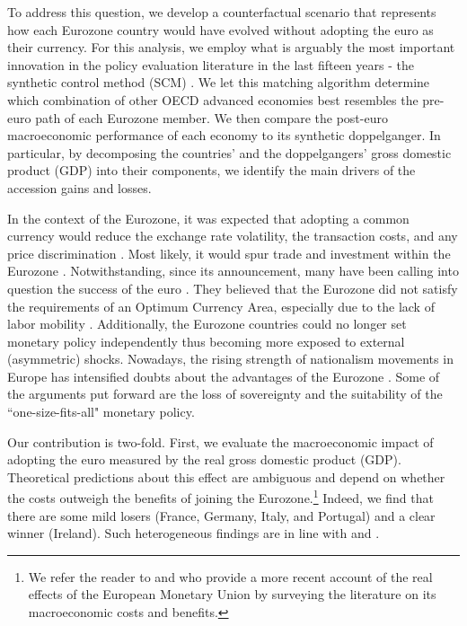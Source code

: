 \documentclass[12pt]{article}
\begin{document}
To address this question, we develop a counterfactual scenario that represents how each Eurozone country would have evolved without adopting the euro as their currency. For this analysis, we employ what is arguably the most important innovation in the policy evaluation literature in the last fifteen years - the synthetic control method (SCM) \citep{Athey2017}. We let this matching algorithm determine which combination of other OECD advanced economies best resembles the pre-euro path of each Eurozone member. We then compare the post-euro macroeconomic performance of each economy to its synthetic doppelganger. In particular, by decomposing the countries' and the doppelgangers' gross domestic product (GDP) into their components, we identify the main drivers of the accession gains and losses.

In the context of the Eurozone, it was expected that adopting a common currency would reduce the exchange rate volatility, the transaction costs, and any price discrimination \citep{DeGrauwe2020}. Most likely, it would spur trade and investment within the Eurozone \citep{Frankel1998}. Notwithstanding, since its announcement, many have been calling into question the success of the euro \citep{Wyplosz2006}. They believed that the Eurozone did not satisfy the requirements of an Optimum Currency Area, especially due to the lack of labor mobility \citep{Jonung2009}. Additionally, the Eurozone countries could no longer set monetary policy independently thus becoming more exposed to external (asymmetric) shocks. Nowadays, the rising strength of nationalism movements in Europe has intensified doubts about the advantages of the Eurozone \citep{Fligstein2012, Guiso2019}. Some of the arguments put forward are the loss of sovereignty and the suitability of the ``one-size-fits-all" monetary policy. %

Our contribution is two-fold. First, we evaluate the macroeconomic impact of adopting the euro measured by the real gross domestic product (GDP). Theoretical predictions about this effect are ambiguous and depend on whether the costs outweigh the benefits of joining the Eurozone.\footnote{We refer the reader to \cite{Lane2006} and \cite{Beetsma2010} who provide a more recent account of the real effects of the European Monetary Union by surveying the literature on its macroeconomic costs and benefits.} Indeed, we find that there are some mild losers (France, Germany, Italy, and Portugal) and a clear winner (Ireland). Such heterogeneous findings are in line with  \cite{DeGrauwe2020} and \cite{Puzzello2018}.
\end{document}
